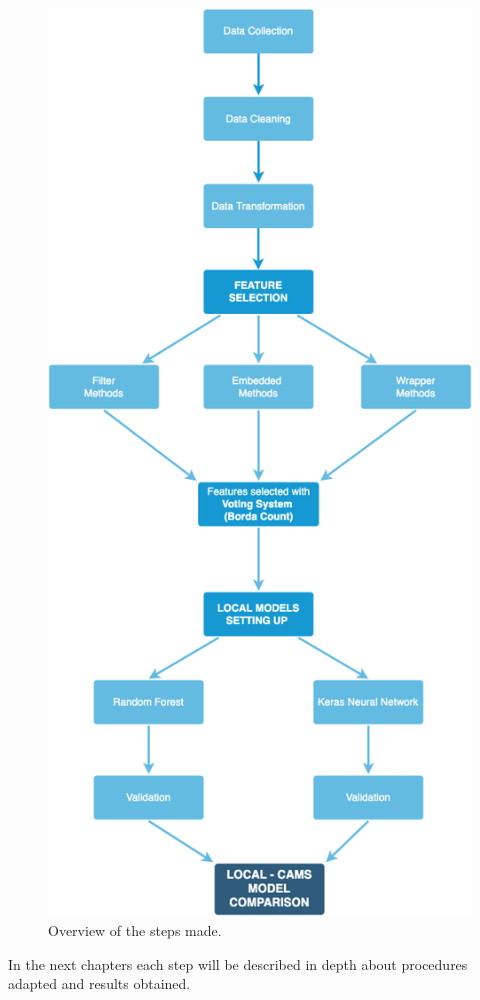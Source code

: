 \begin{figure}[H]
    \centering
    \includegraphics[scale=0.35]{images/overview.png}
    \caption{Overview of the steps made.}
    \label{fig:overview}
\end{figure}

In the next chapters each step will be described in depth about procedures adapted and results obtained.